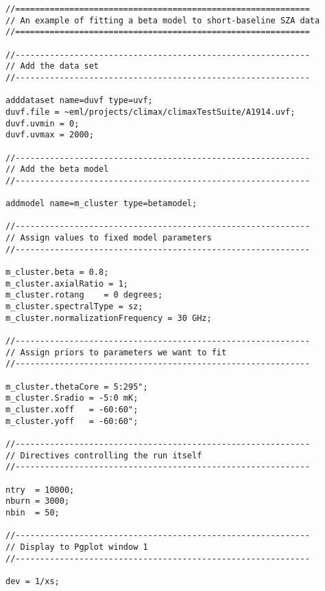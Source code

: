 \begin{myindentpar}{3cm}
\small
\begin{verbatim}
//============================================================
// An example of fitting a beta model to short-baseline SZA data
//============================================================

//------------------------------------------------------------
// Add the data set
//------------------------------------------------------------

adddataset name=duvf type=uvf;
duvf.file = ~eml/projects/climax/climaxTestSuite/A1914.uvf;
duvf.uvmin = 0;
duvf.uvmax = 2000;

//------------------------------------------------------------
// Add the beta model
//------------------------------------------------------------

addmodel name=m_cluster type=betamodel;

//------------------------------------------------------------
// Assign values to fixed model parameters
//------------------------------------------------------------

m_cluster.beta = 0.8;
m_cluster.axialRatio = 1;
m_cluster.rotang    = 0 degrees;
m_cluster.spectralType = sz;
m_cluster.normalizationFrequency = 30 GHz;

//------------------------------------------------------------
// Assign priors to parameters we want to fit
//------------------------------------------------------------

m_cluster.thetaCore = 5:295";
m_cluster.Sradio = -5:0 mK;
m_cluster.xoff   = -60:60";
m_cluster.yoff   = -60:60";

//------------------------------------------------------------
// Directives controlling the run itself
//------------------------------------------------------------

ntry  = 10000;
nburn = 3000;
nbin  = 50;

//------------------------------------------------------------
// Display to Pgplot window 1
//------------------------------------------------------------

dev = 1/xs;
\end{verbatim}
\end{myindentpar}


